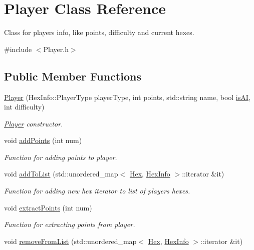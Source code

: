 \hypertarget{classPlayer}{}\section{Player Class Reference}
\label{classPlayer}


Class for player\textquotesingle{}s info, like points, difficulty and current hexes.  




{\ttfamily \#include $<$Player.\+h$>$}

\subsection*{Public Member Functions}
\begin{DoxyCompactItemize}
\item 
\hyperlink{classPlayer_af78467003eee8a8c15744cd2955f7ba9}{Player} (Hex\+Info\+::\+Player\+Type player\+Type, int points, std\+::string name, bool \hyperlink{classPlayer_ae38022bf2dfc8d84b0e93a281529462c}{is\+AI}, int difficulty)
\begin{DoxyCompactList}\small\item\em \hyperlink{classPlayer}{Player} constructor. \end{DoxyCompactList}\item 
void \hyperlink{classPlayer_a3d73100c99e7943d777f8d40b10d64ce}{add\+Points} (int num)
\begin{DoxyCompactList}\small\item\em Function for adding points to player. \end{DoxyCompactList}\item 
void \hyperlink{classPlayer_ae48883ce4625b5dbbca8438c67a8c84f}{add\+To\+List} (std\+::unordered\+\_\+map$<$ \hyperlink{classHex}{Hex}, \hyperlink{structHexInfo}{Hex\+Info} $>$\+::iterator \&it)
\begin{DoxyCompactList}\small\item\em Function for adding new hex iterator to list of players hexes. \end{DoxyCompactList}\item 
void \hyperlink{classPlayer_a822cb6c0adcf2cba9da77aa37cb1b08d}{extract\+Points} (int num)
\begin{DoxyCompactList}\small\item\em Function for extracting points from player. \end{DoxyCompactList}\item 
void \hyperlink{classPlayer_ada0e9188098fc1000914de6045e93b40}{remove\+From\+List} (std\+::unordered\+\_\+map$<$ \hyperlink{classHex}{Hex}, \hyperlink{structHexInfo}{Hex\+Info} $>$\+::iterator \&it)

\end{DoxyCompactItemize}
